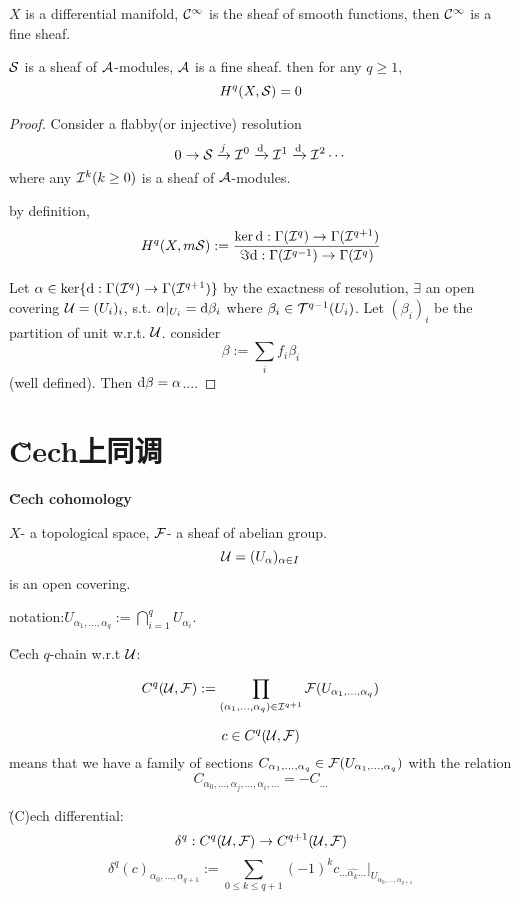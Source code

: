 \begin{example}
$X$ is a differential manifold,
$\mathcal{C}^{\infty}$ is the sheaf of smooth functions,
then $\mathcal{C}^{\infty}$ is a fine sheaf.
\end{example}

\begin{thm}
$\mathcal{S}$ is a sheaf of $\mathcal{A}$-modules,
$\mathcal{A}$ is a fine sheaf. then for any $q\geq 1$,
$$H^q(X,\mathcal{S})=0$$
\end{thm}
\begin{proof}
Consider a flabby(or injective) resolution
$$0\to\mathcal{S}\xrightarrow{j}\mathcal{I}^0\xrightarrow{\mathrm{d}}\mathcal{I}^1\xrightarrow{\mathrm{d}}\mathcal{I}^2\cdots$$
where any $\mathcal{I}^k(k\geq 0)$ is a sheaf of $\mathcal{A}$-modules.

by definition,
$$H^q(X,m\mathcal{S}):=\frac{\ker\mathrm{d}:\Gamma(\mathcal{I}^q)\to\Gamma(\mathcal{I}^{q+1})}
                       {\Im\mathrm{d}:\Gamma(\mathcal{I}^{q-1})\to\Gamma(\mathcal{I}^{q})}$$

Let $\alpha\in\ker\{\mathrm{d}:\Gamma(\mathcal{I}^q)\to\Gamma(\mathcal{I}^{q+1})\}$
by the exactness of resolution, $\exists$ an open covering $\mathcal{U}=(U_{i})_{i}$,
s.t. $\alpha|_{U_{i}}=\mathrm{d}\beta_{i}$
where $\beta_{i}\in\mathcal{T}^{q-1}(U_{i})$.
Let $(\beta_{i})_{i}$ be the partition of unit w.r.t. $\mathcal{U}$.
consider
$$\beta:=\sum_{i}f_i\beta_i$$
(well defined). Then $\mathrm{d}\beta=\alpha$....
\end{proof}

\section{\u{C}ech上同调}
\textbf{\u{C}ech cohomology}

$X$- a topological space, $\mathcal{F}$- a sheaf of abelian group.
$$\mathcal{U}=(U_{\alpha})_{\alpha\in I}$$
is an open covering.

notation:$U_{\alpha_1,...,\alpha_q}:=\bigcap_{i=1}^qU_{\alpha_i}$.

\u{C}ech $q$-chain w.r.t $\mathcal{U}$:

$$C^q(\mathcal{U},\mathcal{F}):=\prod_{(\alpha_1,...,\alpha_q)
\in\mathcal{I}^{q+1}}\mathcal{F}(U_{\alpha_1,...,\alpha_q})$$

$$c\in C^q(\mathcal{U},\mathcal{F})$$
means that we have a family of sections
$C_{\alpha_1,...,\alpha_q}\in\mathcal{F}(U_{\alpha_1,...,\alpha_q})$
with the relation
$$C_{\alpha_0,...,\alpha_j,...,\alpha_i,...}=-C_{...}$$

\u(C)ech differential:
$$\delta^q:C^q(\mathcal{U},\mathcal{F})\to C^{q+1}(\mathcal{U},\mathcal{F})$$
$$\delta^q(c)_{\alpha_0,...,\alpha_{q+1}}
:=\sum_{0\leq k\leq q+1}(-1)^k
c_{...\hat{\alpha_k}...}|_{U_{\alpha_0,...,\alpha_{q+1}}}$$

